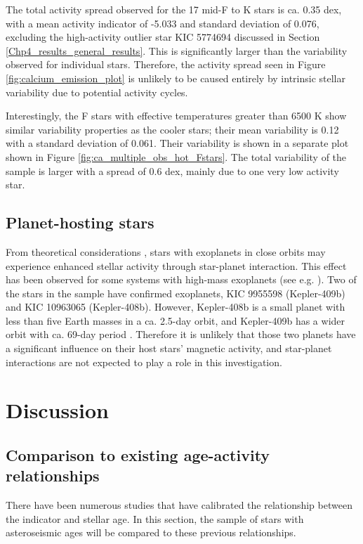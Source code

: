 The total activity spread observed for the 17 mid-F to K stars is ca. 0.35 dex, with a mean \Rprime activity indicator of -5.033 and standard deviation of 0.076, excluding the high-activity outlier star KIC 5774694 discussed in Section \ref{Chp4_results_general_results}. This is significantly larger than the variability observed for individual stars. Therefore, the activity spread seen in Figure \ref{fig:calcium_emission_plot} is unlikely to be caused entirely by intrinsic stellar variability due to potential activity cycles.

Interestingly, the F stars with effective temperatures greater than 6500 K show similar variability properties as the cooler stars; their mean variability is 0.12 with a standard deviation of 0.061. Their variability is shown in a separate plot shown in Figure \ref{fig:ca_multiple_obs_hot_Fstars}. The total variability of the sample is larger with a spread of 0.6 dex, mainly due to one very low activity star.


\subsection{Planet-hosting stars}
From theoretical considerations \citep{Cuntz_etal_2000}, stars with exoplanets in close orbits may experience enhanced stellar activity through star-planet interaction. This effect has been observed for some systems with high-mass exoplanets (see e.g. \citealt{Poppenhaeger_Wolk_2014,Pillitteri_etal_2015}). Two of the stars in the sample have confirmed exoplanets, KIC 9955598 (Kepler-409b) and KIC 10963065 (Kepler-408b). However, Kepler-408b is a small planet with less than five Earth masses in a ca. 2.5-day orbit, and Kepler-409b has a wider orbit with ca. 69-day period \citep{Marcy_etal_2014}. Therefore it is unlikely that those two planets have a significant influence on their host stars' magnetic activity, and star-planet interactions are not expected to play a role in this investigation.

\section{Discussion}
\label{Chp4_discussion}

\subsection{Comparison to existing age-activity relationships}
There have been numerous studies that have calibrated the relationship between the \Rprime indicator and stellar age. In this section, the sample of stars with asteroseismic ages will be compared to these previous relationships.

